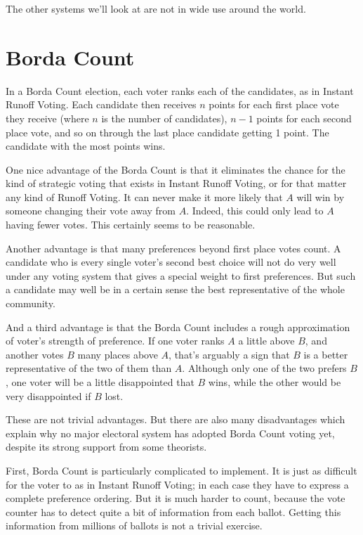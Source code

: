 \documentclass[11pt,]{article}
\begin{document}
The other systems we'll look at are not in wide use around the world.

\hypertarget{borda-count}{%
\section{Borda Count}\label{borda-count}}

In a Borda Count election, each voter ranks each of the candidates, as
in Instant Runoff Voting. Each candidate then receives \(n\) points for
each first place vote they receive (where \(n\) is the number of
candidates), \(n-1\) points for each second place vote, and so on
through the last place candidate getting 1 point. The candidate with the
most points wins.

One nice advantage of the Borda Count is that it eliminates the chance
for the kind of strategic voting that exists in Instant Runoff Voting,
or for that matter any kind of Runoff Voting. It can never make it more
likely that \(A\) will win by someone changing their vote away from
\(A\). Indeed, this could only lead to \(A\) having fewer votes. This
certainly seems to be reasonable.

Another advantage is that many preferences beyond first place votes
count. A candidate who is every single voter's second best choice will
not do very well under any voting system that gives a special weight to
first preferences. But such a candidate may well be in a certain sense
the best representative of the whole community.

And a third advantage is that the Borda Count includes a rough
approximation of voter's strength of preference. If one voter ranks
\(A\) a little above \(B\), and another votes \(B\) many places above
\(A\), that's arguably a sign that \(B\) is a better representative of
the two of them than \(A\). Although only one of the two prefers \(B\),
one voter will be a little disappointed that \(B\) wins, while the other
would be very disappointed if \(B\) lost.

These are not trivial advantages. But there are also many disadvantages
which explain why no major electoral system has adopted Borda Count
voting yet, despite its strong support from some theorists.

First, Borda Count is particularly complicated to implement. It is just
as difficult for the voter to as in Instant Runoff Voting; in each case
they have to express a complete preference ordering. But it is much
harder to count, because the vote counter has to detect quite a bit of
information from each ballot. Getting this information from millions of
ballots is not a trivial exercise.
\end{document}
